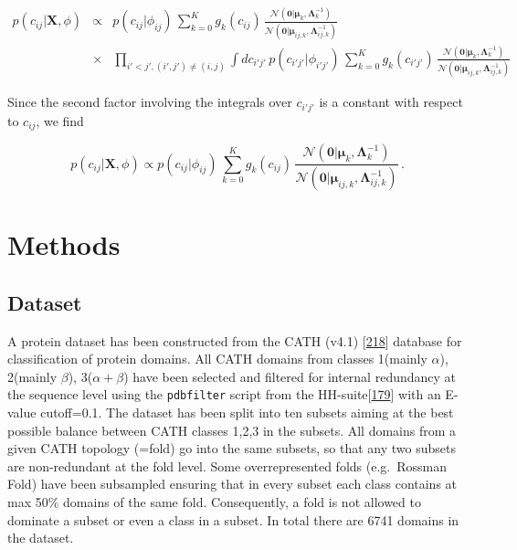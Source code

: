 \documentclass[11pt,a4paper,twoside]{book}
\newcommand{\Gauss}{\mathcal{N}}
\newcommand{\Lijk}{\mathbf{\Lambda}_{ij,k}}
\newcommand{\Lk}{\mathbf{\Lambda}_k}
\newcommand{\muijk}{\mathbf{\mu}_{ij,k}}
\newcommand{\muk}{\mathbf{\mu}_k}
\newcommand{\cij}{c_{ij}}
\newcommand{\X}{\mathbf{X}}
\theoremstyle{definition}
\theoremstyle{definition}
\theoremstyle{remark}
\begin{document}
\begin{eqnarray}
    p(\cij | \X, \phi) & \propto & 
            p(\cij |\phi_{ij}) \, \sum_{k=0}^K g_{k}(\cij) \, \frac{\Gauss( \mathbf{0} | \muk, \Lk^{-1})}{\Gauss(\mathbf{0} | \muijk, \Lijk^{-1})} \nonumber\\
            & \times  & \prod_{i'<j', (i',j') \ne (i,j)} \int d c_{i'j'} \, p(c_{i'j'} |\phi_{i'j'}) \, \sum_{k=0}^K g_{k}(c_{i'j'}) \, \frac{\Gauss( \mathbf{0} | \muk, \Lk^{-1})}{\Gauss(\mathbf{0} | \muijk, \Lijk^{-1})}
\end{eqnarray}

Since the second factor involving the integrals over \(c_{i'j'}\) is a
constant with respect to \(\cij\), we find

\begin{equation}
    p(\cij | \X, \phi) \propto  p(\cij |\phi_{ij}) \,  \sum_{k=0}^K g_{k}(\cij) \, \frac{\Gauss( \mathbf{0} | \muk, \Lk^{-1})}{\Gauss(\mathbf{0} | \muijk, \Lijk^{-1})}  \, .
\label{eq:posterior-marginal-rij}
\end{equation}

\chapter{Methods}\label{methods}

\section{Dataset}\label{dataset}

A protein dataset has been constructed from the CATH (v4.1)
{[}\protect\hyperlink{ref-Sillitoe2015}{218}{]} database for
classification of protein domains. All CATH domains from classes
1(mainly \(\alpha\)), 2(mainly \(\beta\)), 3(\(\alpha+\beta\)) have been
selected and filtered for internal redundancy at the sequence level
using the \texttt{pdbfilter} script from the
HH-suite{[}\protect\hyperlink{ref-Remmert2012}{179}{]} with an E-value
cutoff=0.1. The dataset has been split into ten subsets aiming at the
best possible balance between CATH classes 1,2,3 in the subsets. All
domains from a given CATH topology (=fold) go into the same subsets, so
that any two subsets are non-redundant at the fold level. Some
overrepresented folds (e.g.~Rossman Fold) have been subsampled ensuring
that in every subset each class contains at max 50\% domains of the same
fold. Consequently, a fold is not allowed to dominate a subset or even a
class in a subset. In total there are 6741 domains in the dataset.
\end{document}
